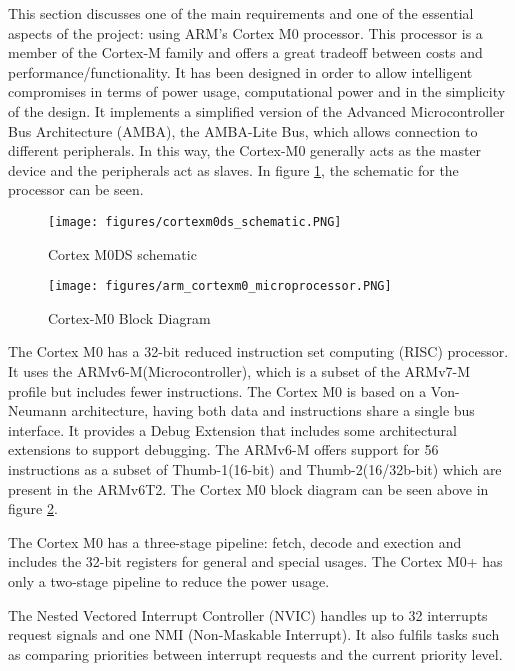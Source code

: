 
This section discusses one of the main requirements and one of the essential aspects of the project: using ARM's Cortex M0 processor. This processor is a member of the Cortex-M family and offers a great tradeoff between costs and performance/functionality. It has been designed in order to allow intelligent compromises in terms of power usage, computational power and in the simplicity of the design. It implements a simplified version of the Advanced Microcontroller Bus Architecture (AMBA), the AMBA-Lite Bus, which allows connection to different peripherals. In this way, the Cortex-M0 generally acts as the master device and the peripherals act as slaves. In figure \ref{fig:cortexm0ds}, the schematic for the processor can be seen.

\begin{figure}
\centering
\texttt{[image: figures/cortexm0ds\_schematic.PNG]}
\caption{Cortex M0DS schematic \cite{armdesignstart}} \label{fig:cortexm0ds}
\end{figure}
\clearpage

\begin{figure}
\centering
\texttt{[image: figures/arm\_cortexm0\_microprocessor.PNG]}
\caption{Cortex-M0 Block Diagram \cite{armdesignstart}} \label{fig:cortex_block}
\end{figure}

The Cortex M0 has a 32-bit reduced instruction set computing (RISC) processor. It uses the ARMv6-M(Microcontroller), which is a subset of the ARMv7-M profile but includes fewer instructions. The Cortex M0 is based on a Von-Neumann architecture, having both data and instructions share a single bus interface. It provides a Debug Extension that includes some architectural extensions to support debugging. The ARMv6-M offers support for 56 instructions as a subset of  Thumb-1(16-bit) and Thumb-2(16/32b-bit) which are present in the ARMv6T2. The Cortex M0 block diagram can be seen above in figure \ref{fig:cortex_block}. 

The Cortex M0 has a three-stage pipeline: fetch, decode and exection and includes the 32-bit registers for general and special usages. The Cortex M0+ has only a two-stage pipeline to reduce the power usage.

The Nested Vectored Interrupt Controller (NVIC) handles up to 32 interrupts request signals and one NMI (Non-Maskable Interrupt). It also fulfils tasks such as comparing priorities between  interrupt requests and the current priority level. 

